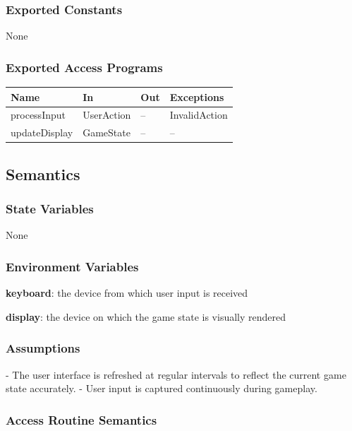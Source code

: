 \documentclass[12pt]{article}
\begin{document}
\subsubsection{Exported Constants}

None

\subsubsection{Exported Access Programs}

\begin{tabular}{|l|l|l|l|}
\hline
\textbf{Name} & \textbf{In} & \textbf{Out} & \textbf{Exceptions} \\
\hline
processInput & UserAction & -- & InvalidAction \\
\hline
updateDisplay & GameState & -- & -- \\
\hline
\end{tabular}

\subsection{Semantics}

\subsubsection{State Variables}

None

\subsubsection{Environment Variables}

\textbf{keyboard}: the device from which user input is received

\textbf{display}: the device on which the game state is visually rendered

\subsubsection{Assumptions}

- The user interface is refreshed at regular intervals to reflect the current game state accurately.
- User input is captured continuously during gameplay.

\subsubsection{Access Routine Semantics}
\end{document}
